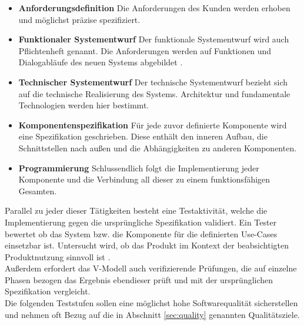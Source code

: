 \begin{itemize}
\item \textbf{Anforderungsdefinition} Die Anforderungen des Kunden werden erhoben und möglichst präzise spezifiziert.
\item \textbf{Funktionaler Systementwurf} Der funktionale Systementwurf wird auch Pflichtenheft genannt. Die Anforderungen werden auf Funktionen und Dialogabläufe des neuen Systems abgebildet \cite{spillner_basiswissen_2012}.
\item \textbf{Technischer Systementwurf} Der technische Systementwurf bezieht sich auf die technische Realisierung des Systems. Architektur und fundamentale Technologien werden hier bestimmt.
\item \textbf{Komponentenspezifikation} Für jede zuvor definierte Komponente wird eine Spezifikation geschrieben. Diese enthält den inneren Aufbau, die Schnittstellen nach außen und die Abhängigkeiten zu anderen Komponenten.
\item \textbf{Programmierung} Schlussendlich folgt die Implementierung jeder Komponente und die Verbindung all dieser zu einem funktionsfähigen Gesamten.
\end{itemize}

Parallel zu jeder dieser Tätigkeiten besteht eine Testaktivität, welche die Implementierung gegen die ursprüngliche Spezifikation validiert. Ein Tester bewertet ob das System bzw. die Komponente für die definierten Use-Cases einsetzbar ist. Untersucht wird, ob das Produkt im Kontext der beabsichtigten Produktnutzung sinnvoll ist \cite{spillner_basiswissen_2012}.\\
Außerdem erfordert das V-Modell auch verifizierende Prüfungen, die auf einzelne Phasen bezogen das Ergebnis ebendieser prüft und mit der ursprünglichen Spezifikation vergleicht.\\
Die folgenden Teststufen sollen eine möglichst hohe Softwarequalität sicherstellen und nehmen oft Bezug auf die in Abschnitt \ref{sec:quality} genannten Qualitätsziele.

